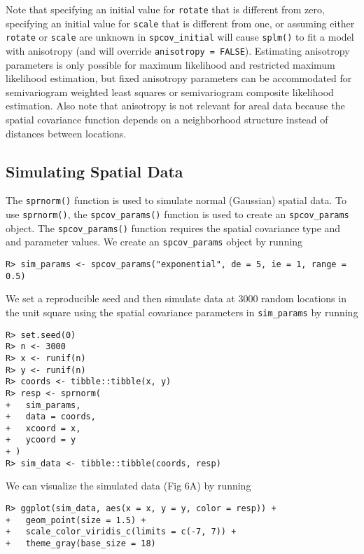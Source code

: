 \documentclass[10pt,letterpaper]{article}
\begin{document}
Note that specifying an initial value for \texttt{rotate} that is
different from zero, specifying an initial value for \texttt{scale} that
is different from one, or assuming either \texttt{rotate} or
\texttt{scale} are unknown in \texttt{spcov\_initial} will cause
\texttt{splm()} to fit a model with anisotropy (and will override
\texttt{anisotropy\ =\ FALSE}). Estimating anisotropy parameters is only
possible for maximum likelihood and restricted maximum likelihood
estimation, but fixed anisotropy parameters can be accommodated for
semivariogram weighted least squares or semivariogram composite
likelihood estimation. Also note that anisotropy is not relevant for
areal data because the spatial covariance function depends on a
neighborhood structure instead of distances between locations.

\hypertarget{sec:sim_data}{%
\subsection{Simulating Spatial Data}\label{sec:sim_data}}

The \texttt{sprnorm()} function is used to simulate normal (Gaussian)
spatial data. To use \texttt{sprnorm()}, the \texttt{spcov\_params()}
function is used to create an \texttt{spcov\_params} object. The
\texttt{spcov\_params()} function requires the spatial covariance type
and and parameter values. We create an \texttt{spcov\_params} object by
running

\begin{verbatim}
R> sim_params <- spcov_params("exponential", de = 5, ie = 1, range = 0.5)
\end{verbatim}

We set a reproducible seed and then simulate data at 3000 random
locations in the unit square using the spatial covariance parameters in
\texttt{sim\_params} by running

\begin{verbatim}
R> set.seed(0)
R> n <- 3000
R> x <- runif(n)
R> y <- runif(n)
R> coords <- tibble::tibble(x, y)
R> resp <- sprnorm(
+   sim_params,
+   data = coords,
+   xcoord = x,
+   ycoord = y
+ )
R> sim_data <- tibble::tibble(coords, resp)
\end{verbatim}

We can visualize the simulated data (Fig 6A) by running

\begin{verbatim}
R> ggplot(sim_data, aes(x = x, y = y, color = resp)) +
+   geom_point(size = 1.5) +
+   scale_color_viridis_c(limits = c(-7, 7)) + 
+   theme_gray(base_size = 18)
\end{verbatim}
\end{document}
